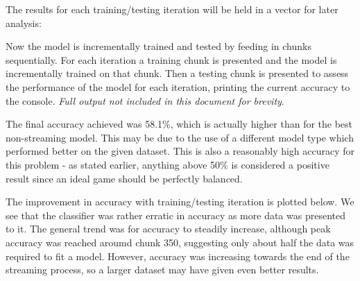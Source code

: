 \documentclass[10pt]{article}
\begin{document}
The results for each training/testing iteration will be held in a vector for later analysis:
\begin{Schunk}
\end{Schunk}
Now the model is incrementally trained and tested by feeding in chunks sequentially. For each iteration a training chunk is presented and the model is incrementally trained on that chunk. Then a testing chunk is presented to assess the performance of the model for each iteration, printing the current accuracy to the console. \textit{Full output not included in this document for brevity}.

\begin{Schunk}
\end{Schunk}

The final accuracy achieved was 58.1\%, which is actually higher than for the best non-streaming model. This may be due to the use of a different model type which performed better on the given dataset. This is also a reasonably high accuracy for this problem - as stated earlier, anything above 50\% is considered a positive result since an ideal game should be perfectly balanced.

The improvement in accuracy with training/testing iteration is plotted below. We see that the classifier was rather erratic in accuracy as more data was presented to it. The general trend was for accuracy to steadily increase, although peak accuracy was reached aroumd chunk 350, suggesting only about half the data was required to fit a model. However, accuracy was increasing towards the end of the streaming process, so a larger dataset may have given even better results.
\end{document}
